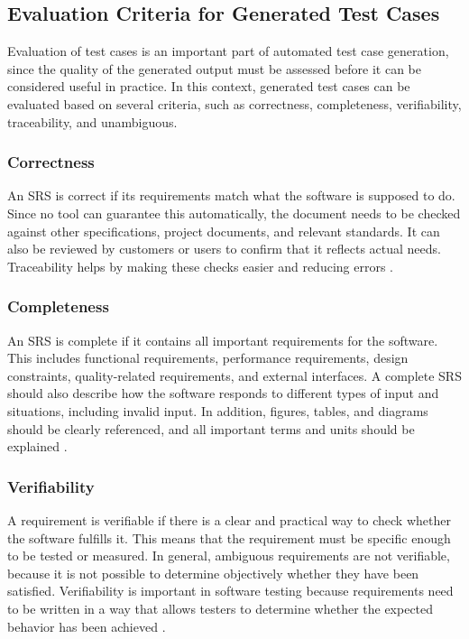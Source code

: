 \documentclass[a4paper,12pt]{article}
\begin{document}
\subsection{Evaluation Criteria for Generated Test Cases}
Evaluation of test cases is an important part of automated test case generation, since the quality of the generated output must be assessed before it can be considered useful in practice. In this context, generated test cases can be evaluated based on several criteria, such as correctness, completeness, verifiability, traceability, and unambiguous.

\subsubsection{Correctness}
An SRS is correct if its requirements match what the software is supposed to do. Since no tool can guarantee this automatically, the document needs to be checked against other specifications, project documents, and relevant standards. It can also be reviewed by customers or users to confirm that it reflects actual needs. Traceability helps by making these checks easier and reducing errors \cite{doe2011recommended}.

\subsubsection{Completeness}
An SRS is complete if it contains all important requirements for the software. This includes functional requirements, performance requirements, design constraints, quality-related requirements, and external interfaces. A complete SRS should also describe how the software responds to different types of input and situations, including invalid input. In addition, figures, tables, and diagrams should be clearly referenced, and all important terms and units should be explained \cite{doe2011recommended}.

\subsubsection{Verifiability}
A requirement is verifiable if there is a clear and practical way to check whether the software fulfills it. This means that the requirement must be specific enough to be tested or measured. In general, ambiguous requirements are not verifiable, because it is not possible to determine objectively whether they have been satisfied. Verifiability is important in software testing because requirements need to be written in a way that allows testers to determine whether the expected behavior has been achieved \cite{doe2011recommended}.
\end{document}
